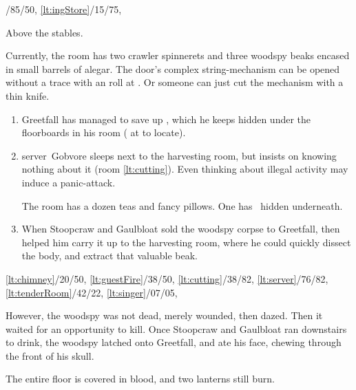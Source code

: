\documentclass[10pt,twoside]{book}
\begin{document}
%
  {%
    /85/50,%
    \ref{lt:ingStore}/15/75,
  }%
{Above the stables.\par}
Currently, the room has two \gls{crawler} spinnerets and three \gls{woodspy} beaks encased in small barrels of alegar.
The door's complex string-mechanism can be opened without a trace with an  roll at \tn[9].
Or someone can just cut the mechanism with a thin knife.

\begin{enumerate}\itemsep0em
  \item
  Greetfall has managed to save up \lootBig, which he keeps hidden under the floorboards in his room ( at \tn[10] to locate).
  \label{lt:tenderRoom}
  \item
  \Gls{server}~Gobvore sleeps next to the \gls{harvesting} room, but insists on knowing nothing about it (room \vref{lt:cutting}).
  \label{lt:server}
  Even thinking about illegal activity may induce a panic-attack.

  The room has a dozen teas and fancy pillows.
  One has \lootSmall\ hidden underneath.
  \item
  \label{lt:cutting}
  When Stoopcraw and Gaulbloat sold the \gls{woodspy} corpse to Greetfall, then helped him carry it up to the \gls{harvesting} room, where he could quickly dissect the body, and extract that valuable beak.
  \setcounter{diceNo}{\value{enumi}}
\end{enumerate}

%
{%
  \ref{lt:chimney}/20/50,
  \ref{lt:guestFire}/38/50,
  \ref{lt:cutting}/38/82,
  \ref{lt:server}/76/82,
  \ref{lt:tenderRoom}/42/22,
  \ref{lt:singer}/07/05,
}%
{}

However, the \gls{woodspy} was not dead, merely wounded, then dazed.
Then it waited for an opportunity to kill.
Once Stoopcraw and Gaulbloat ran downstairs to drink, the \gls{woodspy} latched onto Greetfall, and ate his face, chewing through the front of his skull.

The entire floor is covered in blood, and two lanterns still burn.

\end{document}
